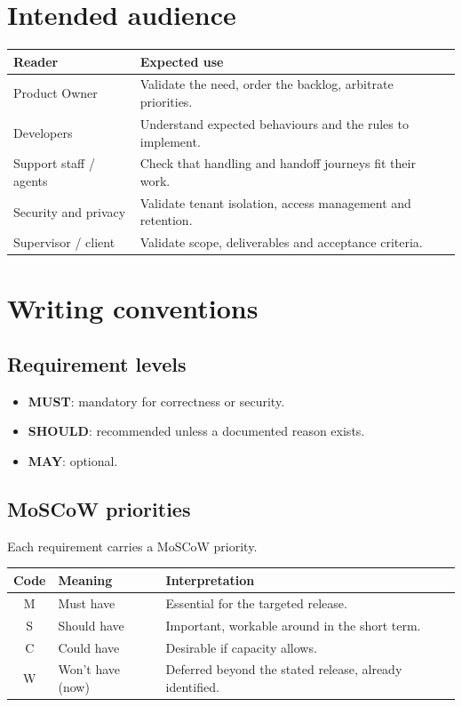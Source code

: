 \section{Intended audience}
\begin{tabular}{@{}p{4.3cm}p{11.7cm}@{}}
\toprule \textbf{Reader} & \textbf{Expected use} \\ \midrule
Product Owner & Validate the need, order the backlog, arbitrate priorities. \\
Developers & Understand expected behaviours and the rules to implement. \\
Support staff / agents & Check that handling and handoff journeys fit their work. \\
Security and privacy & Validate tenant isolation, access management and retention. \\
Supervisor / client & Validate scope, deliverables and acceptance criteria. \\
\bottomrule
\end{tabular}

\section{Writing conventions}
\subsection{Requirement levels}
\begin{itemize}
  \item \textbf{MUST}: mandatory for correctness or security.
  \item \textbf{SHOULD}: recommended unless a documented reason exists.
  \item \textbf{MAY}: optional.
\end{itemize}

\subsection{MoSCoW priorities}
Each requirement carries a MoSCoW priority.
\begin{center}
\begin{tabular}{@{}cll@{}}
\toprule \textbf{Code} & \textbf{Meaning} & \textbf{Interpretation} \\ \midrule
M & Must have & Essential for the targeted release. \\
S & Should have & Important, workable around in the short term. \\
C & Could have & Desirable if capacity allows. \\
W & Won't have (now) & Deferred beyond the stated release, already identified. \\
\bottomrule
\end{tabular}
\end{center}


